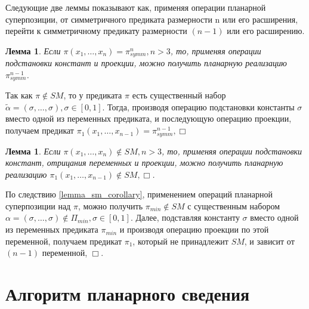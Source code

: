 \documentclass[12pt]{extarticle}
\newtheorem{lemma}[theorem]{Лемма}
\newenvironment{proof}[1][Доказательство.]{\begin{trivlist}
\item[\hskip \labelsep {\bfseries #1}]}{\end{trivlist}}
\begin{document}
Следующие две леммы показывают как, применяя операции планарной суперпозиции, от симметричного предиката
размерности n или его расширения, перейти к симметричному предикату размерности $(n-1)$ или его расширению.

\begin{lemma}
\label{eq:svedenie1}
Если $\pi(x_1, \dots, x_n) = \pi_{symm}^n, n > 3$, то, 
применяя операции подстановки констант и проекции, можно получить планарную реализацию $\pi_{symm}^{n-1}$.
\end{lemma}

\begin{proof}
Так как 
$\pi \notin SM$, то у предиката $\pi$ есть существенный набор $\widetilde{\alpha} = (\sigma, \dots, \sigma), \sigma \in [0,1]$.
Тогда, производя операцию подстановки константы $\sigma$ вместо одной из переменных предиката, и последующую 
операцию проекции, получаем предикат $\pi_1(x_1, \dots, x_{n-1}) = \pi_{symm}^{n-1}, \Box$
\end{proof}

\begin{lemma}
\label{eq:svedenie2}
Если $\pi(x_1, \dots, x_n) \notin SM, n > 3$, то, применяя операции подстановки констант, отрицания переменных и 
проекции, можно получить планарную реализацию $\pi_1(x_1, \dots, x_{n-1}) \notin SM, \Box$.
\end{lemma}

\begin{proof}
По следствию \ref{lemma_sm_corollary}, применением операций планарной суперпозиции над $\pi$, можно получить 
$\pi_{min} \notin SM$ с существенным набором $\alpha=(\sigma, \dots, \sigma) \notin \Pi_{min}, \sigma \in [0,1]$. 
Далее, подставляя константу $\sigma$ вместо одной из переменных предиката $\pi_{min}$ и производя операцию проекции по
этой переменной, получаем предикат $\pi_1$, который
не принадлежит $SM$, и зависит от $(n-1)$ переменной, $\Box$.
\end{proof}

\section{Алгоритм планарного сведения}
\end{document}
